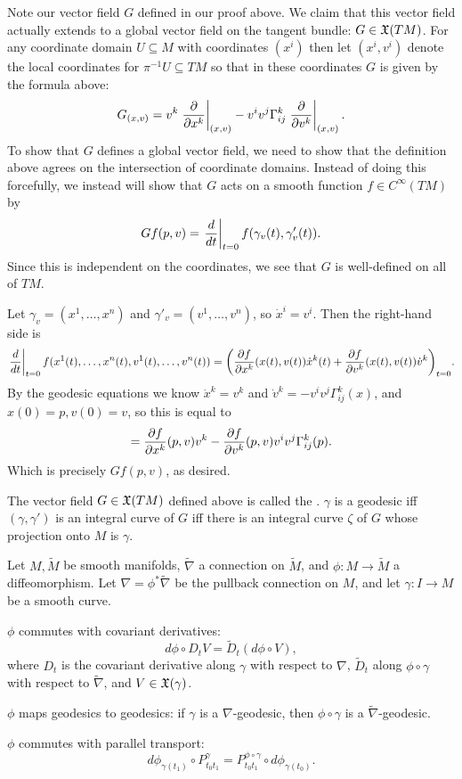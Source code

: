 Note our vector field $G$ defined in our proof above.
We claim that this vector field actually extends to a global vector field on the tangent bundle: $G\in{\frak X}(TM)$.
For any coordinate domain $U\subseteq M$ with coordinates $(x^i)$ then let $(x^i,v^i)$ denote the local coordinates for $\pi^{-1}U\subseteq TM$
so that in these coordinates $G$ is given by the formula above:
$$ G_{(x,v)} = v^k\left.{{\partial }\over{\partial x^k}}\right|_{(x,v)} - v^iv^j\Gamma^k_{ij}\left.{{\partial }\over{\partial v^k}}\right|_{(x,v)} . $$
To show that $G$ defines a global vector field, we need to show that the definition above agrees on the intersection of coordinate domains.
Instead of doing this forcefully, we instead will show that $G$ acts on a smooth function $f\in C^\infty(TM)$ by
$$ Gf(p,v) = \left.{{d}\over{dt}}\right|_{t=0}f(\gamma_v(t),\gamma'_v(t)) . $$
Since this is independent on the coordinates, we see that $G$ is well-defined on all of $TM$.

Let $\gamma_v=(x^1,\dots,x^n)$ and $\gamma'_v=(v^1,\dots,v^n)$, so $\dot x^i=v^i$.
Then the right-hand side is
$$ \left.{{d}\over{dt}}\right|_{t=0}f(x^1(t),\dots,x^n(t),v^1(t),\dots,v^n(t)) =
\mathopen{}\mathclose{\left({{\partial f}\over{\partial x^k}}(x(t),v(t))\dot x^k(t) + {{\partial f}\over{\partial v^k}}(x(t),v(t))\dot v^k\right)}_{t=0} . $$
By the geodesic equations we know $\dot x^k=v^k$ and $\dot v^k=-v^iv^j\Gamma^k_{ij}(x)$, and $x(0)=p,v(0)=v$, so this is equal to
$$ = {{\partial f}\over{\partial x^k}}(p,v)v^k - {{\partial f}\over{\partial v^k}}(p,v)v^iv^j\Gamma^k_{ij}(p) . $$
Which is precisely $Gf(p,v)$, as desired.

\bdefn

    The vector field $G\in{\frak X}(TM)$ defined above is called the .
    $\gamma$ is a geodesic iff $(\gamma,\gamma')$ is an integral curve of $G$ iff there is an integral curve $\zeta$ of $G$ whose projection
    onto $M$ is $\gamma$.

\edefn

\bprop

    Let $M,\tilde M$ be smooth manifolds, $\tilde\nabla$ a connection on $\tilde M$, and $\phi\colon M\to\tilde M$
    a diffeomorphism.
    Let $\nabla=\phi^*\tilde\nabla$ be the pullback connection on $M$, and let $\gamma\colon I\to M$ be a smooth curve.
    \benum
        \item $\phi$ commutes with covariant derivatives:
        $$ d\phi\circ D_tV = \tilde D_t(d\phi\circ V), $$
        where $D_t$ is the covariant derivative along $\gamma$ with respect to $\nabla$, $\tilde D_t$ along $\phi\circ\gamma$
        with respect to $\tilde\nabla$, and $V\in{\frak X}(\gamma)$.
        \item $\phi$ maps geodesics to geodesics: if $\gamma$ is a $\nabla$-geodesic, then $\phi\circ\gamma$ is a
        $\tilde\nabla$-geodesic.
        \item $\phi$ commutes with parallel transport:
        $$ d\phi_{\gamma(t_1)}\circ P^\gamma_{t_0t_1} = P^{\phi\circ\gamma}_{t_0t_1}\circ d\phi_{\gamma(t_0)} . $$
    \eenum

